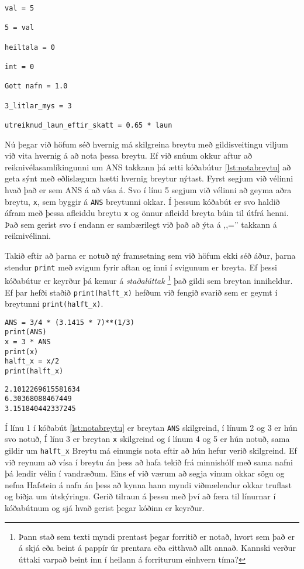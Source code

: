 \begin{lstlisting}[caption=Dæmi um gildisvetingar\, réttar og rangar, label=lst:tolur-gildisveitingar]
val = 5

5 = val

heiltala = 0

int = 0 

Gott nafn = 1.0

3_litlar_mys = 3

utreiknud_laun_eftir_skatt = 0.65 * laun
\end{lstlisting}

Nú þegar við höfum séð hvernig má skilgreina breytu með gildisveitingu viljum við vita hvernig á að nota þessa breytu.
Ef við snúum okkur aftur að reiknivélasamlíkingunni um ANS takkann þá ætti kóðabútur \ref{lst:notabreytu} að geta sýnt með eðlislægum hætti hvernig breytur nýtast.
Fyrst segjum við vélinni hvað það er sem ANS á að vísa á. 
Svo í línu 5 segjum við vélinni að geyma aðra breytu, \texttt{x}, sem byggir á \texttt{ANS} breytunni okkar.
Í þessum kóðabút er svo haldið áfram með þessa afleiddu breytu \texttt{x} og önnur afleidd breyta búin til útfrá henni.
Það sem gerist svo í endann er sambærilegt við það að ýta á ,,='' takkann á reiknivélinni.

Takið eftir að þarna er notuð ný framsetning sem við höfum ekki séð áður, þarna stendur \texttt{print} með svigum fyrir aftan og inni í svigunum er breyta.
Ef þessi kóðabútur er keyrður þá kemur á \textit{staðalúttak} \footnote{Þann stað sem texti myndi prentast þegar forritið er notað, hvort sem það er á skjá eða beint á pappír úr prentara eða eitthvað allt annað. Kannski verður úttaki varpað beint inn í heilann á forriturum einhvern tíma?} 
það gildi sem breytan inniheldur.
Ef þar hefði staðið \texttt{print(halft\_x)} hefðum við fengið svarið sem er geymt í breytunni \texttt{print(halft\_x)}.

\begin{lstlisting}[caption=Að nota breytu, label=lst:notabreytu]
ANS = 3/4 * (3.1415 * 7)**(1/3)
print(ANS)
x = 3 * ANS
print(x)
halft_x = x/2
print(halft_x)
\end{lstlisting}
\lstset{style=uttak}
\begin{lstlisting}
2.1012269615581634
6.30368088467449
3.151840442337245
\end{lstlisting}
\lstset{style=venjulegt}


Í línu 1 í kóðabút \ref{lst:notabreytu} er breytan \texttt{ANS} skilgreind, í línum 2 og 3 er hún svo notuð,
Í línu 3 er breytan \texttt{x} skilgreind og í línum 4 og 5 er hún notuð, sama gildir um \texttt{halft\_x}
Breytu má einungis nota eftir að hún hefur verið skilgreind.
Ef við reynum að vísa í breytu án þess að hafa tekið frá minnishólf með sama nafni þá lendir vélin í vandræðum.
Eins ef við værum að segja vinum okkar sögu og nefna Hafstein á nafn án þess að kynna hann myndi viðmælendur okkar truflast og biðja um útskýringu.
Gerið tilraun á þessu með því að færa til línurnar í kóðabútnum og sjá hvað gerist þegar kóðinn er keyrður.


